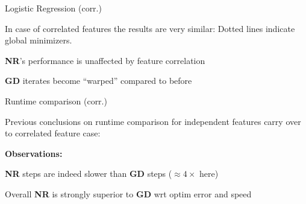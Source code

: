 \documentclass[11pt,compress,t,notes=noshow, xcolor=table]{beamer}
\begin{document}
\begin{framei}{Logistic Regression (corr.)}
\item In case of correlated features the results are very similar:
{\footnotesize Dotted lines indicate global minimizers.}
\item \textbf{NR}'s performance is unaffected by feature correlation
\item \textbf{GD} iterates become ``warped'' compared to before
\end{framei}


\begin{framei}{Runtime comparison (corr.)}
\item Previous conclusions on runtime comparison for independent features carry over to correlated feature case:
\item[] \textbf{Observations:}
\item \textbf{NR} steps are indeed slower than \textbf{GD} steps ($\approx 4\times$ here)
\item Overall \textbf{NR} is strongly superior to \textbf{GD} wrt optim error and speed
\end{framei}


\endlecture
\end{document}
